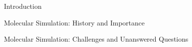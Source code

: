 \begin{chapter}{Introduction}
\begin{section}{Molecular Simulation: History and Importance}

\end{section}
\begin{section}{Molecular Simulation: Challenges and Unanswered Questions}


\end{section}
\end{chapter}
